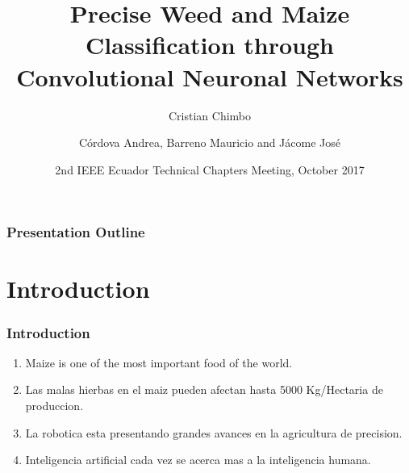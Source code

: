 \documentclass[10pt,a4paper]{beamer}
\author{Cristian Chimbo}
\begin{document}
\title[Precise Weed and Maize Classification through Convolutional Neuronal Networks] %
{Precise Weed and Maize Classification through
Convolutional Neuronal Networks}
 
 
\author[C\'ordova Andrea, Barreno Mauricio and J\'acome Jos\'e] %
{C\'ordova Andrea, Barreno Mauricio and J\'acome Jos\'e}
 
 
\date[Ecuador] %
{2nd IEEE Ecuador Technical Chapters Meeting, October 2017}
\frame{\titlepage}
\begin{frame}
\frametitle{Presentation Outline}
\tableofcontents
\end{frame}
\section{Introduction}
\begin{frame}
\frametitle{Introduction}
\begin{enumerate}
\item Maize is one of the most important food of the world.
\item Las malas hierbas en el maiz pueden afectan hasta 5000 Kg/Hectaria de produccion.
\item La robotica esta presentando grandes avances en la agricultura de precision.
\item Inteligencia artificial cada vez se acerca mas a la inteligencia humana.\\
\end{enumerate}
\end{frame}
\end{document}
